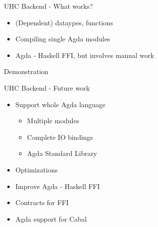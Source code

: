 \begin{frame}{UHC Backend - What works?}
\begin{itemize}
\item (Dependent) dataypes, functions
\item Compiling single Agda modules
\item Agda - Haskell FFI, but involves manual work
\end{itemize}
\end{frame}

\begin{frame}
Demonstration
\end{frame}

\begin{frame}{UHC Backend - Future work}
\begin{itemize}
\item Support whole Agda language
  \begin{itemize}
  \item Multiple modules
  \item Complete IO bindings
  \item Agda Standard Library
  \end{itemize}
\item Optimizations
\item Improve Agda - Haskell FFI
\item Contracts for FFI
\item Agda support for Cabal
\end{itemize}
\end{frame}
